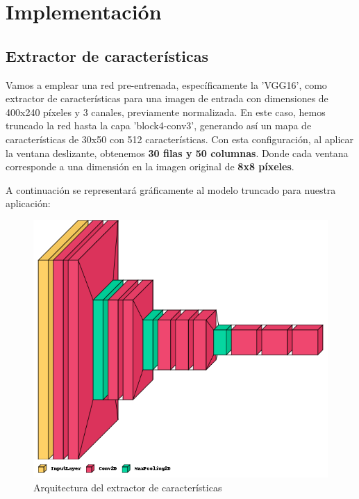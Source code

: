    
\section{Implementación}

    \subsection{Extractor de características}
    Vamos a emplear una red pre-entrenada, específicamente la 'VGG16', como extractor de características para una imagen de entrada con dimensiones de 400x240 píxeles y 3 canales, previamente normalizada. En este caso, hemos truncado la red hasta la capa 'block4-conv3', generando así un mapa de características de 30x50 con 512 características. Con esta configuración, al aplicar la ventana deslizante, obtenemos \textbf{30 filas y 50 columnas}. Donde cada ventana corresponde a una dimensión en la imagen original de \textbf{8x8 píxeles}.

    A continuación se representará gráficamente al modelo truncado para nuestra aplicación:

    \vspace{0.4cm}
    
    \begin{figure}[ht]
	    \centering
		\includegraphics[scale=0.4]{img/VGG16.png}
		\caption{Arquitectura del extractor de características}
	\end{figure}

